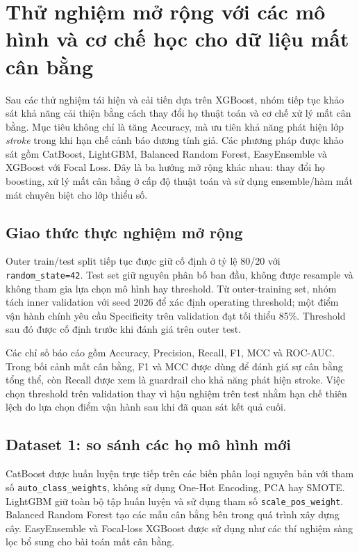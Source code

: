 \section{Thử nghiệm mở rộng với các mô hình và cơ chế học cho dữ liệu mất cân bằng}

Sau các thử nghiệm tái hiện và cải tiến dựa trên XGBoost, nhóm tiếp tục khảo sát khả năng cải thiện bằng cách thay đổi họ thuật toán và cơ chế xử lý mất cân bằng. Mục tiêu không chỉ là tăng Accuracy, mà ưu tiên khả năng phát hiện lớp \textit{stroke} trong khi hạn chế cảnh báo dương tính giả. Các phương pháp được khảo sát gồm CatBoost, LightGBM, Balanced Random Forest, EasyEnsemble và XGBoost với Focal Loss. Đây là ba hướng mở rộng khác nhau: thay đổi họ boosting, xử lý mất cân bằng ở cấp độ thuật toán và sử dụng ensemble/hàm mất mát chuyên biệt cho lớp thiểu số.

\subsection{Giao thức thực nghiệm mở rộng}

Outer train/test split tiếp tục được giữ cố định ở tỷ lệ 80/20 với \texttt{random\_state=42}. Test set giữ nguyên phân bố ban đầu, không được resample và không tham gia lựa chọn mô hình hay threshold. Từ outer-training set, nhóm tách inner validation với seed 2026 để xác định operating threshold; một điểm vận hành chính yêu cầu Specificity trên validation đạt tối thiểu 85\%. Threshold sau đó được cố định trước khi đánh giá trên outer test.

Các chỉ số báo cáo gồm Accuracy, Precision, Recall, F1, MCC và ROC-AUC. Trong bối cảnh mất cân bằng, F1 và MCC được dùng để đánh giá sự cân bằng tổng thể, còn Recall được xem là guardrail cho khả năng phát hiện stroke. Việc chọn threshold trên validation thay vì hậu nghiệm trên test nhằm hạn chế thiên lệch do lựa chọn điểm vận hành sau khi đã quan sát kết quả cuối.

\subsection{Dataset 1: so sánh các họ mô hình mới}

CatBoost được huấn luyện trực tiếp trên các biến phân loại nguyên bản
với tham số \texttt{auto\_class\_weights}, không sử dụng One-Hot Encoding, PCA hay SMOTE.
LightGBM giữ toàn bộ tập huấn luyện và sử dụng tham số
\texttt{scale\_pos\_weight}. Balanced Random Forest tạo các mẫu cân bằng
bên trong quá trình xây dựng cây. EasyEnsemble và Focal-loss XGBoost
được sử dụng như các thí nghiệm sàng lọc bổ sung cho bài toán mất cân bằng.

